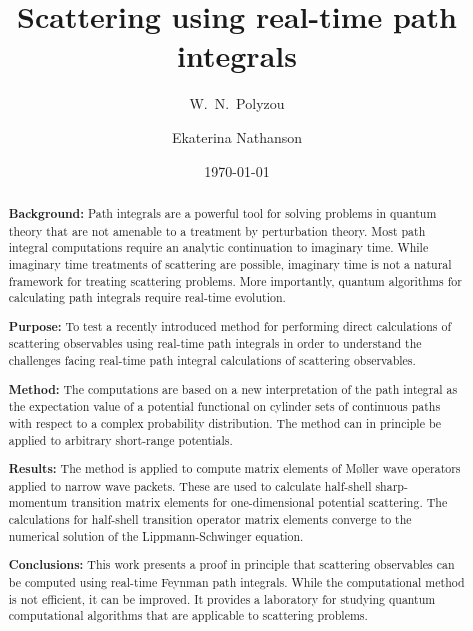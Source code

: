\documentclass[aps,prc,reprint,noshowpacs,groupedaddress,onecolumn]{revtex4}
\begin{document}
\title{Scattering using real-time path integrals}

\author{W.~N.~Polyzou}

\author{Ekaterina Nathanson}

\date{\today}


\begin{abstract}

  {\bf Background:} Path integrals are a powerful tool for solving
  problems in quantum theory that are not amenable to a treatment by
  perturbation theory.  Most path integral computations require an
  analytic continuation to imaginary time.  While imaginary time
  treatments of scattering are possible, imaginary time is not a
  natural framework for treating scattering problems.  More importantly,
  quantum algorithms for calculating path integrals require real-time
  evolution.

  {\bf Purpose:} To test a recently introduced method for performing direct
  calculations of scattering observables using real-time path
  integrals in order to understand the challenges facing real-time
  path integral calculations of scattering observables.  

  {\bf Method:} The computations are based on a new interpretation of
  the path integral as the expectation value of a potential functional
  on cylinder sets of continuous paths with respect to a complex probability
  distribution.  The method can in principle be applied
  to arbitrary short-range potentials.

  {\bf Results:} The method is applied to compute
  matrix elements of M{\o}ller wave operators applied to narrow wave
  packets.  These are used to calculate half-shell sharp-momentum
  transition matrix elements for one-dimensional potential scattering.
  The calculations for half-shell transition operator matrix elements
  converge to the numerical solution of the Lippmann-Schwinger equation.  

  {\bf Conclusions:} This work presents a proof in principle that
  scattering observables can be computed using real-time
  Feynman path integrals.  While the computational method is not efficient,
  it can be improved.  It provides a laboratory for studying quantum
  computational algorithms that are applicable to scattering problems.
 

\end{abstract}
\end{document}
